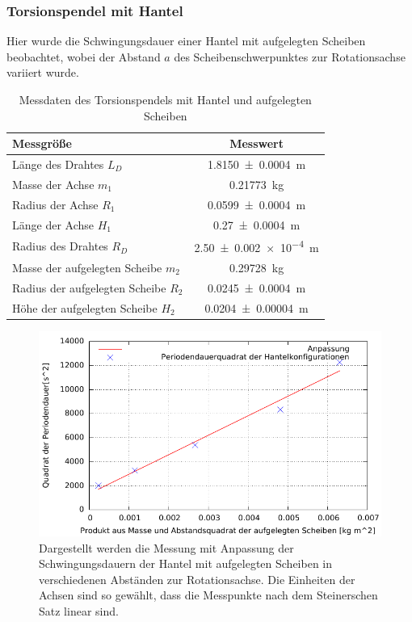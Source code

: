 









\newpage
\subsubsection*{Torsionspendel mit Hantel}
Hier wurde die Schwingungsdauer einer Hantel mit aufgelegten Scheiben beobachtet, wobei der Abstand $a$ des Scheibenschwerpunktes zur Rotationsachse variiert wurde. 



\begin{table}[h]
	\centering	
	\caption{Messdaten des Torsionspendels mit Hantel und aufgelegten Scheiben  }
	\begin{tabular}{|l|c|} 
		\hline 
		Messgröße	& Messwert  \\ 
		\hline 
		Länge des Drahtes $L_D$& \SI{1.8150\pm 0.0004 } {m} \\ 
		\hline 
		Masse der Achse $m_1$& \SI{0.21773}{kg} \\ 
		\hline 
		Radius der Achse $R_1$ & \SI{0.0599 \pm 0.0004}{m}  \\ 
		\hline 
		Länge der Achse $H_1$ &	\SI{0.27\pm 0.0004}	{\metre}	\\
		\hline
		Radius des Drahtes $R_D$ & \SI{2.50+-0.002 e-4} {m} \\ 
		\hline 
		Masse der aufgelegten Scheibe $m_2$& \SI{0.29728}{kg} \\ 
		\hline 
		Radius der aufgelegten Scheibe $R_2$ & \SI{0.0245 \pm 0.0004}{m}  \\ 
		\hline 
		Höhe der aufgelegten Scheibe $H_2$ &\SI{0.0204\pm0.00004 }{\metre}			\\
		\hline
	
	\end{tabular} 
	
	\label{tab:dataTH}
\end{table} 




\begin{figure}[h]
	\centering
	\includegraphics[width=0.7\linewidth]{auswertung/hantel/HantelD}
	\caption{Dargestellt werden die Messung mit Anpassung der Schwingungsdauern der Hantel mit aufgelegten Scheiben in verschiedenen Abständen zur Rotationsachse. Die Einheiten der Achsen sind so gewählt, dass die Messpunkte nach dem Steinerschen Satz linear sind.  }
	\label{fig:hantel}
\end{figure}

